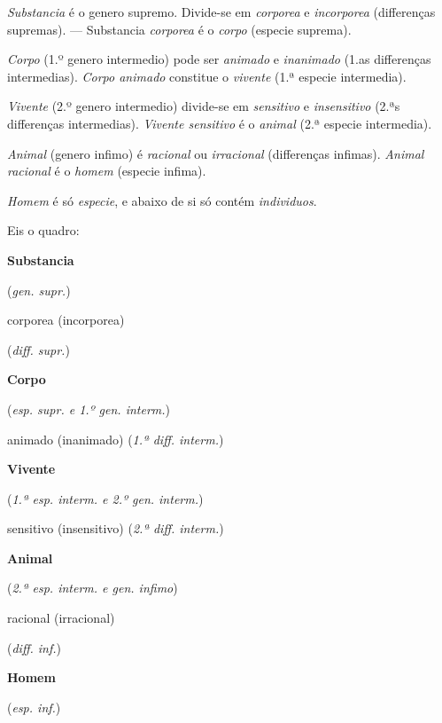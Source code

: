 \emph{Substancia} é o genero supremo. Divide-se em \emph{corporea} e \emph{incorporea} (differenças supremas). --- Substancia \emph{corporea} é o \emph{corpo} (especie suprema).

\emph{Corpo} (1.º genero intermedio) pode ser \emph{animado} e \emph{inanimado} (1.as differenças intermedias). \emph{Corpo animado} constitue o \emph{vivente} (1.ª especie intermedia).

\emph{Vivente} (2.º genero intermedio) divide-se em \emph{sensitivo} e \emph{insensitivo} (2.ªs differenças intermedias). \emph{Vivente sensitivo} é o \emph{animal} (2.ª especie intermedia).

\emph{Animal} (genero infimo) é \emph{racional} ou \emph{irracional} (differenças infimas). \emph{Animal racional} é o \emph{homem} (especie infima).

\emph{Homem} é só \emph{especie}, e abaixo de si só contém \emph{individuos}.

Eis o quadro:

\textbf{Substancia}

(\emph{gen. supr.})

corporea (incorporea)

(\emph{diff. supr.})

\textbf{Corpo}

(\emph{esp. supr. e 1.º gen. interm.})

animado (inanimado) (\emph{1.ª diff. interm.})

\textbf{Vivente}

(\emph{1.ª esp. interm. e 2.º gen. interm.})

sensitivo (insensitivo) (\emph{2.ª diff. interm.})

\textbf{Animal}

(\emph{2.ª esp. interm. e gen. infimo})

racional (irracional)

(\emph{diff. inf.})

\textbf{Homem}

(\emph{esp. inf.})

